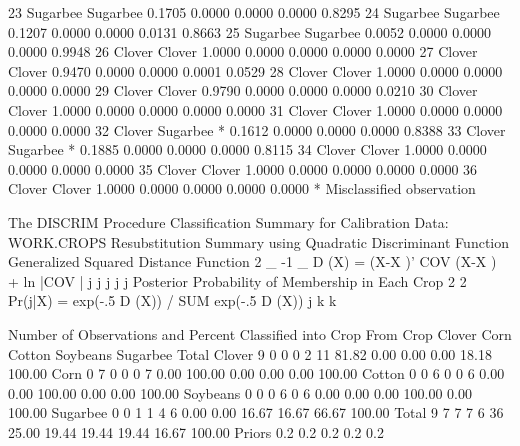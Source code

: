 \documentclass{article}
\begin{document}
\begin{Woutput}
 23    Sugarbee    Sugarbee        0.1705      0.0000      0.0000      0.0000      0.8295
 24    Sugarbee    Sugarbee        0.1207      0.0000      0.0000      0.0131      0.8663
 25    Sugarbee    Sugarbee        0.0052      0.0000      0.0000      0.0000      0.9948
 26    Clover      Clover          1.0000      0.0000      0.0000      0.0000      0.0000
 27    Clover      Clover          0.9470      0.0000      0.0000      0.0001      0.0529
 28    Clover      Clover          1.0000      0.0000      0.0000      0.0000      0.0000
 29    Clover      Clover          0.9790      0.0000      0.0000      0.0000      0.0210
 30    Clover      Clover          1.0000      0.0000      0.0000      0.0000      0.0000
 31    Clover      Clover          1.0000      0.0000      0.0000      0.0000      0.0000
 32    Clover      Sugarbee *      0.1612      0.0000      0.0000      0.0000      0.8388
 33    Clover      Sugarbee *      0.1885      0.0000      0.0000      0.0000      0.8115
 34    Clover      Clover          1.0000      0.0000      0.0000      0.0000      0.0000
 35    Clover      Clover          1.0000      0.0000      0.0000      0.0000      0.0000
 36    Clover      Clover          1.0000      0.0000      0.0000      0.0000      0.0000
* Misclassified observation

The DISCRIM Procedure
Classification Summary for Calibration Data: WORK.CROPS
Resubstitution Summary using Quadratic Discriminant Function
Generalized Squared Distance Function
 2         _       -1   _
D (X) = (X-X )' COV  (X-X ) + ln |COV |
 j          j      j     j           j
Posterior Probability of Membership in Each Crop
                   2                    2
Pr(j|X) = exp(-.5 D (X)) / SUM exp(-.5 D (X))
                   j        k           k

                Number of Observations and Percent Classified into Crop
From
Crop           Clover         Corn       Cotton      Soybeans      Sugarbee        Total
Clover              9            0            0             0             2           11
                81.82         0.00         0.00          0.00         18.18       100.00
Corn                0            7            0             0             0            7
                 0.00       100.00         0.00          0.00          0.00       100.00
Cotton              0            0            6             0             0            6
                 0.00         0.00       100.00          0.00          0.00       100.00
Soybeans            0            0            0             6             0            6
                 0.00         0.00         0.00        100.00          0.00       100.00
Sugarbee            0            0            1             1             4            6
                 0.00         0.00        16.67         16.67         66.67       100.00
Total               9            7            7             7             6           36
                25.00        19.44        19.44         19.44         16.67       100.00
Priors            0.2          0.2          0.2           0.2           0.2


\end{Woutput}
\end{document}
